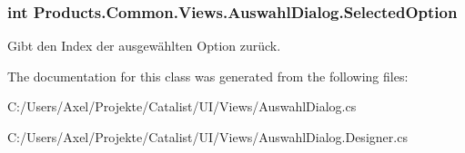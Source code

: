 \subsubsection[{\texorpdfstring{Selected\+Option}{SelectedOption}}]{\setlength{\rightskip}{0pt plus 5cm}int Products.\+Common.\+Views.\+Auswahl\+Dialog.\+Selected\+Option\hspace{0.3cm}{\ttfamily [get]}}\hypertarget{class_products_1_1_common_1_1_views_1_1_auswahl_dialog_aad41cf34a28da24a220c8a99b6dd6cfb}{}\label{class_products_1_1_common_1_1_views_1_1_auswahl_dialog_aad41cf34a28da24a220c8a99b6dd6cfb}


Gibt den Index der ausgewählten Option zurück. 



The documentation for this class was generated from the following files\+:\begin{DoxyCompactItemize}
\item 
C\+:/\+Users/\+Axel/\+Projekte/\+Catalist/\+U\+I/\+Views/Auswahl\+Dialog.\+cs\item 
C\+:/\+Users/\+Axel/\+Projekte/\+Catalist/\+U\+I/\+Views/Auswahl\+Dialog.\+Designer.\+cs\end{DoxyCompactItemize}
